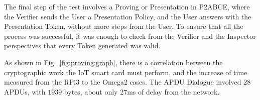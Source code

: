 \hfil

The final step of the test involves a Proving or Presentation in P2ABCE, where the Verifier sends the User a Presentation Policy, and the User answers with the Presentation Token, without more steps from the User. To ensure that all the process was successful, it was enough to check from the Verifier and the Inspector perspectives that every Token generated was valid.


As shown in Fig.~\ref{fig:proving:graph}, there is a correlation between the cryptographic work the IoT smart card must perform, and the increase of time measured from the RPi3 to the Omega2 cases. 
The APDU Dialogue involved $28$ APDUs, with $1939$ bytes, about only $27$ms of delay from the network.




